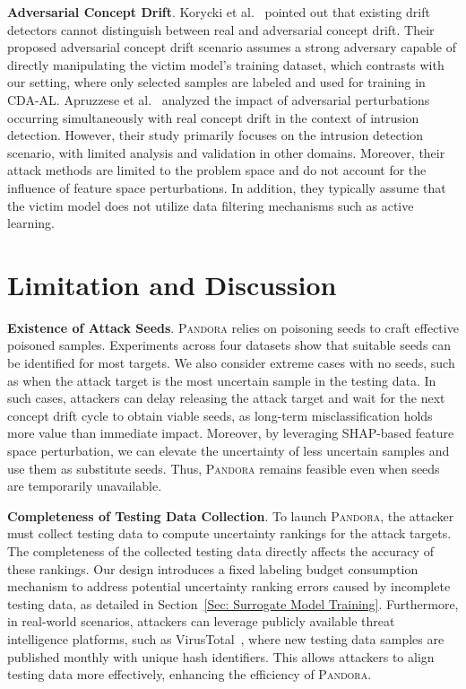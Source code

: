 \documentclass[lettersize,journal]{IEEEtran}
\newcommand{\pandora}{{\scshape Pandora}\xspace}
\begin{document}
\textbf{Adversarial Concept Drift}.
Korycki et al.~\cite{2023-CCF-B-Adversarial-concept-drift-detection-under-poisoning-attacks} pointed out that existing drift detectors cannot distinguish between real and adversarial concept drift. 
Their proposed adversarial concept drift scenario assumes a strong adversary capable of directly manipulating the victim model’s training dataset, which contrasts with our setting, where only selected samples are labeled and used for training in CDA-AL.
Apruzzese et al.~\cite{apruzzese2024adversarial} analyzed the impact of adversarial perturbations occurring simultaneously with real concept drift in the context of intrusion detection.
However, their study primarily focuses on the intrusion detection scenario, with limited analysis and validation in other domains.
Moreover, their attack methods are limited to the problem space and do not account for the influence of feature space perturbations.
In addition, they typically assume that the victim model does not utilize data filtering mechanisms such as active learning.

\section{Limitation and Discussion}

\textbf{Existence of Attack Seeds}.
\pandora relies on poisoning seeds to craft effective poisoned samples.
Experiments across four datasets show that suitable seeds can be identified for most targets.
We also consider extreme cases with no seeds, such as when the attack target is the most uncertain sample in the testing data.
In such cases, attackers can delay releasing the attack target and wait for the next concept drift cycle to obtain viable seeds, as long-term misclassification holds more value than immediate impact.
Moreover, by leveraging SHAP-based feature space perturbation, we can elevate the uncertainty of less uncertain samples and use them as substitute seeds. 
Thus, \pandora remains feasible even when seeds are temporarily unavailable.

\textbf{Completeness of Testing Data Collection}.
To launch \pandora, the attacker must collect testing data to compute uncertainty rankings for the attack targets.
The completeness of the collected testing data directly affects the accuracy of these rankings.
Our design introduces a fixed labeling budget consumption mechanism to address potential uncertainty ranking errors caused by incomplete testing data, as detailed in Section~\ref{Sec: Surrogate Model Training}.
Furthermore, in real-world scenarios, attackers can leverage publicly available threat intelligence platforms, such as VirusTotal~\cite{Virustotaluploadinterface}, where new testing data samples are published monthly with unique hash identifiers.
This allows attackers to align testing data more effectively, enhancing the efficiency of \pandora.
\end{document}
